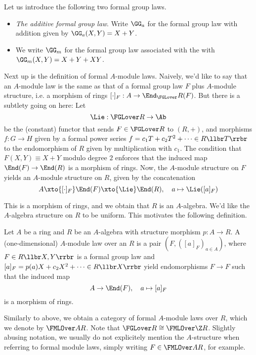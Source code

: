 \documentclass[../main.tex]{subfiles}
\begin{document}
\begin{xpl} Let us introduce the following two formal group laws.
  \begin{itemize}
    \item \textit{The additive formal group law}. Write 
      $\GG_a$ for the formal group law with addition given by 
      $\GG_a(X,Y) = X + Y$. 
    \item We write $\GG_m$ for the formal group law associated with the 
      with $\GG_m(X,Y) = X + Y + XY$. 
  \end{itemize}
\end{xpl}

Next up is the definition of formal $A$-module laws. Naively, we'd like to say
that an $A$-module law is the same as that of a formal group law $F$
plus $A$-module structure, i.e. a morphism of rings $[\cdot]_F: A \to
\End_\FGLover R(F)$. But there is a subtlety going on here: Let 
\begin{equation*}
  \Lie: \FGLover R \to \Ab 
\end{equation*}
be the (constant) functor that sends $F \in \FGLover R$ to $(R,+)$, and morphisms
$f: G \to H$ given by a formal power series
$f = c_1 T + c_2 T^2 + \dots \in R\llbr T \rrbr$ to the endomorphism
of $R$ given by multiplication with $c_1$. The condition that 
$F(X,Y) \equiv X+Y$ modulo degree $2$ enforces that the induced map
$\End(F) \to \End(R)$ is a morphism of rings. Now, the $A$-module structure on $F$ 
yields an $A$-module structure on $R$, given by the concatenation\begin{equation*}
  A \xto{[\cdot]_F} \End(F) \xto{\Lie} \End(R), \quad a \mapsto \Lie([a]_F)
\end{equation*}

This is a morphism of rings, and we obtain that $R$ is an $A$-algebra. We'd
like the $A$-algebra structure on $R$ to be uniform. This
motivates the following definition.
\begin{defi}
  Let $A$ be a ring and $R$ be an $A$-algebra with structure
  morphism $p: A \to R$. A (one-dimensional) $A$-module law over an $R$ is a
  pair $(F, ([a]_F)_{a \in A})$, where $F \in R\llbr X,Y \rrbr$ is 
  a formal group law and $[a]_F = p(a)X + c_2X^2 + \dots 
  \in R\llbr X \rrbr$ yield endomorphisms $F \to F$ such that the induced map
  \begin{equation*}
    A \to \End(F), \quad a \mapsto [a]_F 
  \end{equation*}
  is a morphism of rings.
\end{defi}
Similarly to above, we obtain a category of formal $A$-module laws over $R$,
which we denote by $\FMLOver A R$. Note that $\FGLover R \cong \FMLOver \Z R$.
Slightly abusing notation, we usually do not explicitely mention the $A$-structure
when referring to formal module laws, simply writing $F \in \FMLOver AR$, for
example. 
\end{document}
